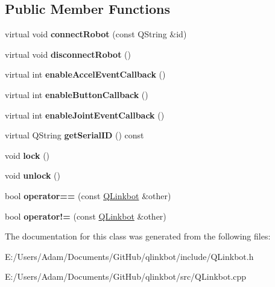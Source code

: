 \subsection*{Public Member Functions}
\begin{DoxyCompactItemize}
\item 
\hypertarget{class_q_linkbot_aa1f41b061c82c1cb581d7a8be8cbef9e}{virtual void {\bfseries connect\-Robot} (const Q\-String \&id)}\label{class_q_linkbot_aa1f41b061c82c1cb581d7a8be8cbef9e}

\item 
\hypertarget{class_q_linkbot_ab6903f8b9f8d0f78bef4690dd2f30038}{virtual void {\bfseries disconnect\-Robot} ()}\label{class_q_linkbot_ab6903f8b9f8d0f78bef4690dd2f30038}

\item 
\hypertarget{class_q_linkbot_a7e156b431df408db2a7a5e931a64c70b}{virtual int {\bfseries enable\-Accel\-Event\-Callback} ()}\label{class_q_linkbot_a7e156b431df408db2a7a5e931a64c70b}

\item 
\hypertarget{class_q_linkbot_affd651759494b44d6c2b63c38eaa7dd2}{virtual int {\bfseries enable\-Button\-Callback} ()}\label{class_q_linkbot_affd651759494b44d6c2b63c38eaa7dd2}

\item 
\hypertarget{class_q_linkbot_a44190b9f975f35480ac484724a6f70d4}{virtual int {\bfseries enable\-Joint\-Event\-Callback} ()}\label{class_q_linkbot_a44190b9f975f35480ac484724a6f70d4}

\item 
\hypertarget{class_q_linkbot_a40a942fe57ef1a244f4fbf5b6a8ae8ff}{virtual Q\-String {\bfseries get\-Serial\-I\-D} () const }\label{class_q_linkbot_a40a942fe57ef1a244f4fbf5b6a8ae8ff}

\item 
\hypertarget{class_q_linkbot_a148e1892efa406a64467ac53292ae901}{void {\bfseries lock} ()}\label{class_q_linkbot_a148e1892efa406a64467ac53292ae901}

\item 
\hypertarget{class_q_linkbot_a13af1ef77a0a2c83c6ea090fcb2f3988}{void {\bfseries unlock} ()}\label{class_q_linkbot_a13af1ef77a0a2c83c6ea090fcb2f3988}

\item 
\hypertarget{class_q_linkbot_a9cbfa651dcb09f00eb8417fc3c885784}{bool {\bfseries operator==} (const \hyperlink{class_q_linkbot}{Q\-Linkbot} \&other)}\label{class_q_linkbot_a9cbfa651dcb09f00eb8417fc3c885784}

\item 
\hypertarget{class_q_linkbot_a799bbadfc9f1c0f34d110c60bb935590}{bool {\bfseries operator!=} (const \hyperlink{class_q_linkbot}{Q\-Linkbot} \&other)}\label{class_q_linkbot_a799bbadfc9f1c0f34d110c60bb935590}

\end{DoxyCompactItemize}


The documentation for this class was generated from the following files\-:\begin{DoxyCompactItemize}
\item 
E\-:/\-Users/\-Adam/\-Documents/\-Git\-Hub/qlinkbot/include/Q\-Linkbot.\-h\item 
E\-:/\-Users/\-Adam/\-Documents/\-Git\-Hub/qlinkbot/src/Q\-Linkbot.\-cpp\end{DoxyCompactItemize}
